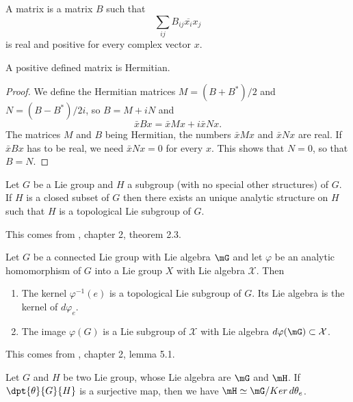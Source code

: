 \begin{definition}
    A  matrix is a matrix $B$ such that
    \begin{equation}
        \sum_{ij}B_{ij}\overline{ x_i }x_j
    \end{equation}
    is real and positive for every complex vector $x$.
\end{definition}

\begin{proposition}
    A positive defined matrix is Hermitian.
\end{proposition}

\begin{proof}
    We define the Hermitian matrices $M=(B+B^*)/2$ and $N=(B-B^*)/2i$, so $B=M+iN$ and
    \begin{equation}
        \bar x Bx=\bar x M x+i\bar x Nx.
    \end{equation}
    The matrices $M$ and $B$ being Hermitian, the numbers $\bar xMx$ and $\bar xNx$ are real. If $\bar xBx$ has to be real, we need $\bar xNx=0$ for every $x$. This shows that $N=0$, so that $B=N$.
\end{proof}

\begin{theorem}
Let $G$ be a Lie group and $H$ a subgroup (with no special other structures) of $G$. If $H$ is a closed subset of $G$ then there exists an unique analytic structure on $H$ such that $H$ is a topological Lie subgroup of $G$.
\label{Helgason2.3}
\end{theorem}
This comes from \cite{Helgason}, chapter 2, theorem 2.3.

\begin{lemma}
Let $G$ be a connected Lie group with Lie algebra $\mG$ and let $\varphi$ be an analytic homomorphism of $G$ into a Lie group $X$ with Lie algebra $\mathcal{X}$. Then

\begin{enumerate}
\item The kernel $\varphi^{-1}(e)$ is a topological Lie subgroup of $G$. Its Lie algebra is the kernel of $d\varphi_e$.
\item The image $\varphi(G)$ is a Lie subgroup of $\mathcal{X}$ with Lie algebra $d\varphi(\mG)\subset\mathcal{X}$.
\end{enumerate}
\label{Helgason5.1}
\end{lemma}
This comes from \cite{Helgason}, chapter 2, lemma 5.1.

\begin{lemma}
Let $G$ and $H$ be two Lie group, whose Lie algebra are $\mG$ and $\mH$. If $\dpt{\theta}{G}{H}$ is a surjective map, then we have $\mH\simeq\mG/Ker\,d\theta_e$.
\label{1203r1}
\end{lemma}

